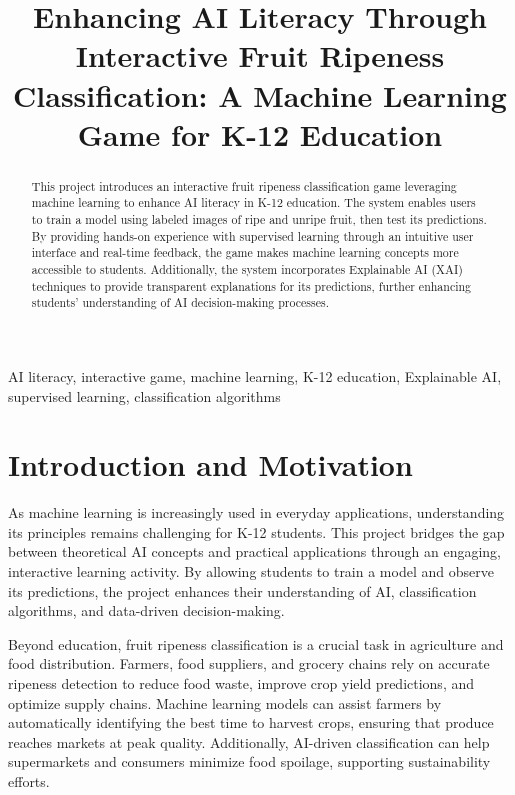 \documentclass[conference]{IEEEtran}
\begin{document}
\title{Enhancing AI Literacy Through Interactive Fruit Ripeness Classification: A Machine Learning Game for K-12 Education}

\author{
}

\maketitle

\begin{abstract}
This project introduces an interactive fruit ripeness classification game leveraging machine learning to enhance AI literacy in K-12 education. The system enables users to train a model using labeled images of ripe and unripe fruit, then test its predictions. By providing hands-on experience with supervised learning through an intuitive user interface and real-time feedback, the game makes machine learning concepts more accessible to students. Additionally, the system incorporates Explainable AI (XAI) techniques to provide transparent explanations for its predictions, further enhancing students' understanding of AI decision-making processes.
\end{abstract}

\begin{IEEEkeywords}
AI literacy, interactive game, machine learning, K-12 education, Explainable AI, supervised learning, classification algorithms
\end{IEEEkeywords}

\section{Introduction and Motivation}
As machine learning is increasingly used in everyday applications, understanding its principles remains challenging for K-12 students. This project bridges the gap between theoretical AI concepts and practical applications through an engaging, interactive learning activity. By allowing students to train a model and observe its predictions, the project enhances their understanding of AI, classification algorithms, and data-driven decision-making.

Beyond education, fruit ripeness classification is a crucial task in agriculture and food distribution. Farmers, food suppliers, and grocery chains rely on accurate ripeness detection to reduce food waste, improve crop yield predictions, and optimize supply chains. Machine learning models can assist farmers by automatically identifying the best time to harvest crops, ensuring that produce reaches markets at peak quality. Additionally, AI-driven classification can help supermarkets and consumers minimize food spoilage, supporting sustainability efforts.
\end{document}
